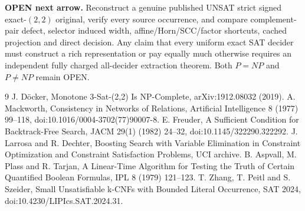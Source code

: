 \documentclass[10pt]{article}
\begin{document}
\noindent\textbf{OPEN next arrow.} Reconstruct a genuine published UNSAT strict signed exact-$(2,2)$ original, verify every source occurrence, and compare complement-pair defect, selector induced width, affine/Horn/SCC/factor shortcuts, cached projection and direct decision. Any claim that every uniform exact SAT decider must construct a rich representation or pay equally much otherwise requires an independent fully charged all-decider extraction theorem. Both $P=NP$ and $P\ne NP$ remain OPEN.

\begin{thebibliography}{9}
 J. D\"ocker, Monotone 3-Sat-(2,2) Is NP-Complete, arXiv:1912.08032 (2019).
 A. Mackworth, Consistency in Networks of Relations, Artificial Intelligence 8 (1977) 99--118, doi:10.1016/0004-3702(77)90007-8.
 E. Freuder, A Sufficient Condition for Backtrack-Free Search, JACM 29(1) (1982) 24--32, doi:10.1145/322290.322292.
 J. Larrosa and R. Dechter, Boosting Search with Variable Elimination in Constraint Optimization and Constraint Satisfaction Problems, UCI archive.
 B. Aspvall, M. Plass and R. Tarjan, A Linear-Time Algorithm for Testing the Truth of Certain Quantified Boolean Formulas, IPL 8 (1979) 121--123.
 T. Zhang, T. Peitl and S. Szeider, Small Unsatisfiable k-CNFs with Bounded Literal Occurrence, SAT 2024, doi:10.4230/LIPIcs.SAT.2024.31.
\end{thebibliography}
\end{document}
